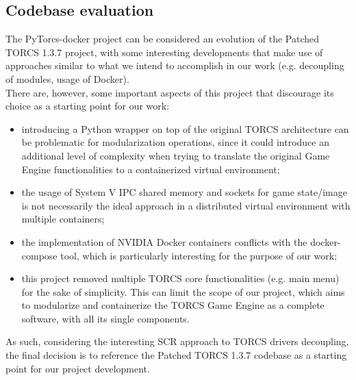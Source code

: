 \subsection{Codebase evaluation}
The PyTorcs-docker project can be considered an evolution of the Patched TORCS 1.3.7 project, with some interesting developments that make use of approaches similar to what we intend to accomplish in our work (e.g. decoupling of modules, usage of Docker). \\
There are, however, some important aspects of this project that discourage its choice as a starting point for our work:
\begin{itemize}
	\item introducing a Python wrapper on top of the original TORCS architecture can be problematic for modularization operations, since it could introduce an additional level of complexity when trying to translate the original Game Engine functionalities to a containerized virtual environment;
	\item the usage of System V IPC shared memory and sockets for game state/image is not necessarily the ideal approach in a distributed virtual environment with multiple containers;
	\item the implementation of NVIDIA Docker containers conflicts with the docker-compose tool, which is particularly interesting for the purpose of our work;
	\item this project removed multiple TORCS core functionalities (e.g. main menu) for the sake of simplicity. This can limit the scope of our project, which aims to modularize and containerize the TORCS Game Engine as a complete software, with all its single components.
\end{itemize} 
As such, considering the interesting SCR approach to TORCS drivers decoupling, the final decision is to reference the Patched TORCS 1.3.7 codebase as a starting point for our project development.

